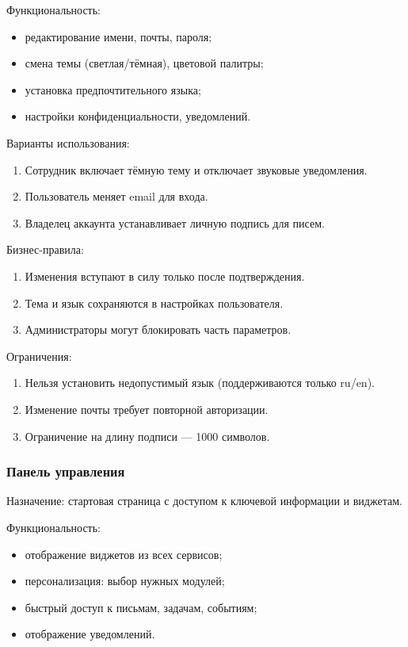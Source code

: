 Функциональность:
\begin{itemize}
  \item редактирование имени, почты, пароля;
  \item смена темы (светлая/тёмная), цветовой палитры;
  \item установка предпочтительного языка;
  \item настройки конфиденциальности, уведомлений.
\end{itemize}

Варианты использования:
\begin{enumerate}
  \item Сотрудник включает тёмную тему и отключает звуковые уведомления.
  \item Пользователь меняет email для входа.
  \item Владелец аккаунта устанавливает личную подпись для писем.
\end{enumerate}

Бизнес-правила:
\begin{enumerate}
  \item Изменения вступают в силу только после подтверждения.
  \item Тема и язык сохраняются в настройках пользователя.
  \item Администраторы могут блокировать часть параметров.
\end{enumerate}

Ограничения:
\begin{enumerate}
  \item Нельзя установить недопустимый язык (поддерживаются только ru/en).
  \item Изменение почты требует повторной авторизации.
  \item Ограничение на длину подписи — 1000 символов.
\end{enumerate}

\subsubsection{Панель управления}

Назначение: стартовая страница с доступом к ключевой информации и виджетам.

Функциональность:
\begin{itemize}
  \item отображение виджетов из всех сервисов;
  \item персонализация: выбор нужных модулей;
  \item быстрый доступ к письмам, задачам, событиям;
  \item отображение уведомлений.
\end{itemize}


